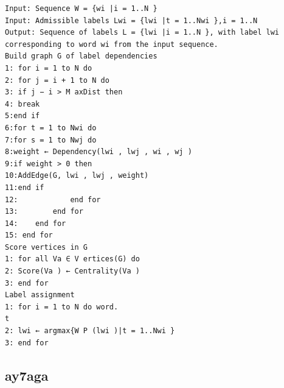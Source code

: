 \begin{lstlisting}[frame=single]                % Start your code-block
Input: Sequence W = {wi |i = 1..N }
Input: Admissible labels Lwi = {lwi |t = 1..Nwi },i = 1..N
Output: Sequence of labels L = {lwi |i = 1..N }, with label lwi corresponding to word wi from the input sequence.
Build graph G of label dependencies
1: for i = 1 to N do
2: for j = i + 1 to N do
3: if j − i > M axDist then
4: break
5:end if
6:for t = 1 to Nwi do
7:for s = 1 to Nwj do
8:weight ← Dependency(lwi , lwj , wi , wj )
9:if weight > 0 then
10:AddEdge(G, lwi , lwj , weight)
11:end if
12:            end for
13:        end for
14:    end for
15: end for
Score vertices in G
1: for all Va ∈ V ertices(G) do
2: Score(Va ) ← Centrality(Va )
3: end for
Label assignment
1: for i = 1 to N do word.                                                                                                 t
2: lwi ← argmax{W P (lwi )|t = 1..Nwi }
3: end for
\end{lstlisting}
\subsection{ay7aga}
